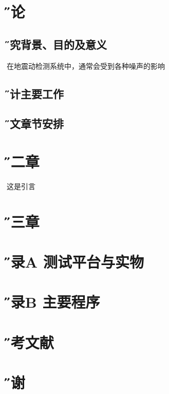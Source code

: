 \documentclass[12pt]{article} %
\newcommand{\sihao}{\fontsize{14pt}{\baselineskip}\selectfont}%
\newcommand{\xiaosanhao}{\fontsize{15pt}{\baselineskip}\selectfont}    %
\begin{document}
\renewcommand{\contentsname}{\centerline{ \sihao \H 目\quad 录}}
  \tableofcontents 
    \newpage
  
     
 \section{\xiaosanhao \H 绪论}  
  
 	 \subsection{\H 研究背景、目的及意义}
 	 在地震动检测系统中，通常会受到各种噪声的影响
 	 
 	 
 	 \subsection{\H 设计主要工作}
 	 
 	  \subsection{\H 论文章节安排}
               
                  
                   
                      \newpage
                   
                   
\section{\xiaosanhao \H 第二章}
这是引言 \LaTeXe



\newpage
 \section{\xiaosanhao \H 第三章}
 
  \section{\xiaosanhao \H 附录A \quad 测试平台与实物}
  
  \section{\xiaosanhao \H 附录B \quad 主要程序}
  
    \section{\xiaosanhao \H 参考文献}
    
      \section{\xiaosanhao \H 致谢}
 
\end{document}
